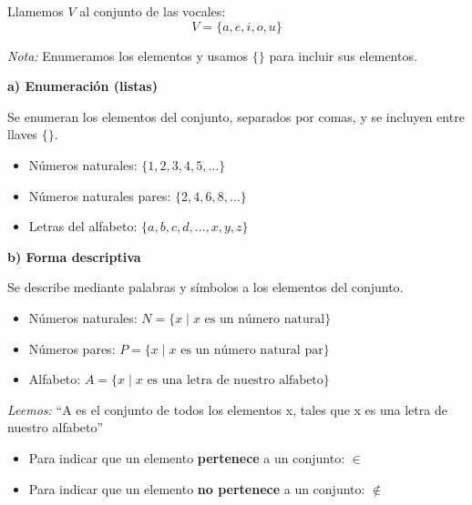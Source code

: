 \begin{example}
Llamemos $V$ al conjunto de las vocales:
$$V = \{a, e, i, o, u\}$$

\textit{Nota:} Enumeramos los elementos y usamos $\{ \}$ para incluir sus elementos.
\end{example}


\textbf{a) Enumeración (listas)}

Se enumeran los elementos del conjunto, separados por comas, y se incluyen entre llaves $\{ \}$.

\begin{example}
\begin{itemize}
    \item Números naturales: $\{1, 2, 3, 4, 5, \ldots\}$
    \item Números naturales pares: $\{2, 4, 6, 8, \ldots\}$
    \item Letras del alfabeto: $\{a, b, c, d, \ldots, x, y, z\}$
\end{itemize}
\end{example}

\textbf{b) Forma descriptiva}

Se describe mediante palabras y símbolos a los elementos del conjunto.

\begin{example}
\begin{itemize}
    \item Números naturales: $N = \{x \mid x \text{ es un número natural}\}$
    \item Números pares: $P = \{x \mid x \text{ es un número natural par}\}$
    \item Alfabeto: $A = \{x \mid x \text{ es una letra de nuestro alfabeto}\}$
\end{itemize}

\textit{Leemos:} ``A es el conjunto de todos los elementos x, tales que x es una letra de nuestro alfabeto''
\end{example}


\begin{definition}
\begin{itemize}
    \item Para indicar que un elemento \textbf{pertenece} a un conjunto: $\in$
    \item Para indicar que un elemento \textbf{no pertenece} a un conjunto: $\notin$
\end{itemize}
\end{definition}

